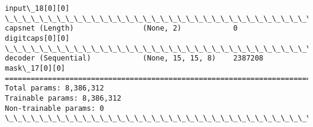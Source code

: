 \documentclass[11pt]{article}
\begin{document}
\begin{Verbatim}[commandchars=\\\{\}]
                                                                 input\_18[0][0]                   
\_\_\_\_\_\_\_\_\_\_\_\_\_\_\_\_\_\_\_\_\_\_\_\_\_\_\_\_\_\_\_\_\_\_\_\_\_\_\_\_\_\_\_\_\_\_\_\_\_\_\_\_\_\_\_\_\_\_\_\_\_\_\_\_\_\_\_\_\_\_\_\_\_\_\_\_\_\_\_\_\_\_\_\_\_\_\_\_\_\_\_\_\_\_\_\_\_\_
capsnet (Length)                (None, 2)            0           digitcaps[0][0]                  
\_\_\_\_\_\_\_\_\_\_\_\_\_\_\_\_\_\_\_\_\_\_\_\_\_\_\_\_\_\_\_\_\_\_\_\_\_\_\_\_\_\_\_\_\_\_\_\_\_\_\_\_\_\_\_\_\_\_\_\_\_\_\_\_\_\_\_\_\_\_\_\_\_\_\_\_\_\_\_\_\_\_\_\_\_\_\_\_\_\_\_\_\_\_\_\_\_\_
decoder (Sequential)            (None, 15, 15, 8)    2387208     mask\_17[0][0]                    
==================================================================================================
Total params: 8,386,312
Trainable params: 8,386,312
Non-trainable params: 0
\_\_\_\_\_\_\_\_\_\_\_\_\_\_\_\_\_\_\_\_\_\_\_\_\_\_\_\_\_\_\_\_\_\_\_\_\_\_\_\_\_\_\_\_\_\_\_\_\_\_\_\_\_\_\_\_\_\_\_\_\_\_\_\_\_\_\_\_\_\_\_\_\_\_\_\_\_\_\_\_\_\_\_\_\_\_\_\_\_\_\_\_\_\_\_\_\_\_

    \end{Verbatim}
\end{document}
